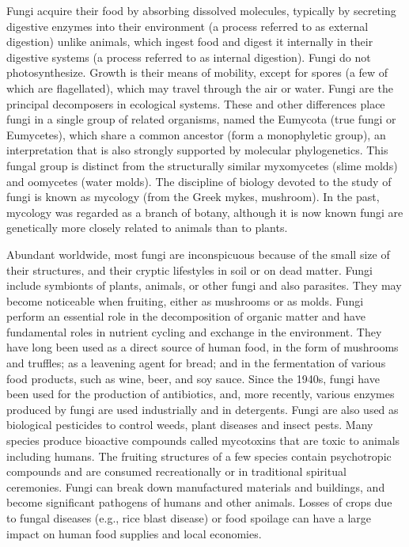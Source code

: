 \documentclass[]{book}
\begin{document}
Fungi acquire their food by absorbing dissolved molecules, typically by secreting digestive enzymes into their environment (a process referred to as external digestion) unlike animals, which ingest food and digest it internally in their digestive systems (a process referred to as internal digestion). Fungi do not photosynthesize. Growth is their means of mobility, except for spores (a few of which are flagellated), which may travel through the air or water. Fungi are the principal decomposers in ecological systems. These and other differences place fungi in a single group of related organisms, named the Eumycota (true fungi or Eumycetes), which share a common ancestor (form a monophyletic group), an interpretation that is also strongly supported by molecular phylogenetics. This fungal group is distinct from the structurally similar myxomycetes (slime molds) and oomycetes (water molds). The discipline of biology devoted to the study of fungi is known as mycology (from the Greek mykes, mushroom). In the past, mycology was regarded as a branch of botany, although it is now known fungi are genetically more closely related to animals than to plants.

Abundant worldwide, most fungi are inconspicuous because of the small size of their structures, and their cryptic lifestyles in soil or on dead matter. Fungi include symbionts of plants, animals, or other fungi and also parasites. They may become noticeable when fruiting, either as mushrooms or as molds. Fungi perform an essential role in the decomposition of organic matter and have fundamental roles in nutrient cycling and exchange in the environment. They have long been used as a direct source of human food, in the form of mushrooms and truffles; as a leavening agent for bread; and in the fermentation of various food products, such as wine, beer, and soy sauce. Since the 1940s, fungi have been used for the production of antibiotics, and, more recently, various enzymes produced by fungi are used industrially and in detergents. Fungi are also used as biological pesticides to control weeds, plant diseases and insect pests. Many species produce bioactive compounds called mycotoxins that are toxic to animals including humans. The fruiting structures of a few species contain psychotropic compounds and are consumed recreationally or in traditional spiritual ceremonies. Fungi can break down manufactured materials and buildings, and become significant pathogens of humans and other animals. Losses of crops due to fungal diseases (e.g., rice blast disease) or food spoilage can have a large impact on human food supplies and local economies.
\end{document}

